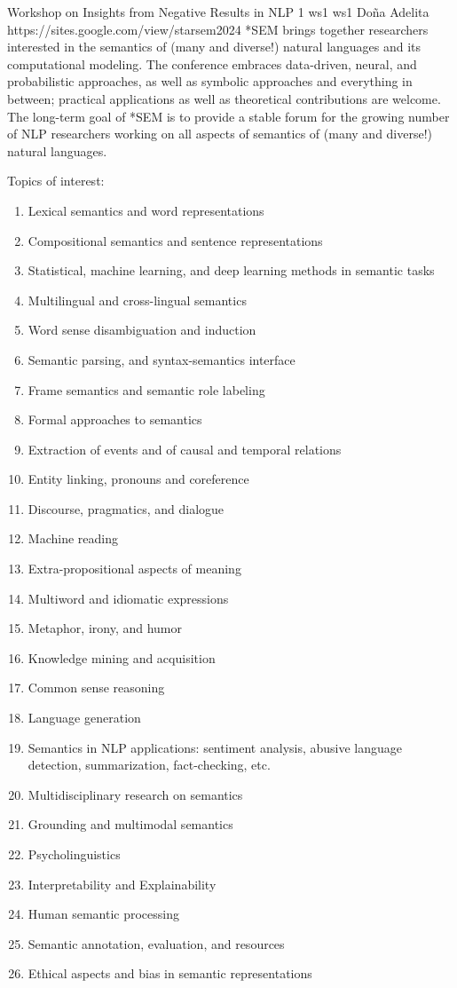 \begin{wsschedulenolist}
{Workshop on Insights from Negative Results in NLP}
{1}
{ws1}
{ws1}
{Do\~na Adelita}
{https://sites.google.com/view/starsem2024}
    *SEM brings together researchers interested in the semantics of (many and diverse!) natural languages and its computational modeling. The conference embraces data-driven, neural, and probabilistic approaches, as well as symbolic approaches and everything in between; practical applications as well as theoretical contributions are welcome. The long-term goal of *SEM is to provide a stable forum for the growing number of NLP researchers working on all aspects of semantics of (many and diverse!) natural languages.

    Topics of interest:

\begin{enumerate}
\item Lexical semantics and word representations
\item Compositional semantics and sentence representations
\item Statistical, machine learning, and deep learning methods in semantic tasks
\item Multilingual and cross-lingual semantics
\item Word sense disambiguation and induction
\item Semantic parsing, and syntax-semantics interface
\item Frame semantics and semantic role labeling
\item Formal approaches to semantics
\item Extraction of events and of causal and temporal relations
\item Entity linking, pronouns and coreference
\item Discourse, pragmatics, and dialogue
\item Machine reading
\item Extra-propositional aspects of meaning
\item Multiword and idiomatic expressions
\item Metaphor, irony, and humor
\item Knowledge mining and acquisition
\item Common sense reasoning
\item Language generation
\item Semantics in NLP applications: sentiment analysis, abusive language detection, summarization, fact-checking, etc.
\item Multidisciplinary research on semantics
\item Grounding and multimodal semantics
\item Psycholinguistics
\item Interpretability and Explainability
\item Human semantic processing
\item Semantic annotation, evaluation, and resources
\item Ethical aspects and bias in semantic representations
\end{enumerate}
\end{wsschedulenolist}
